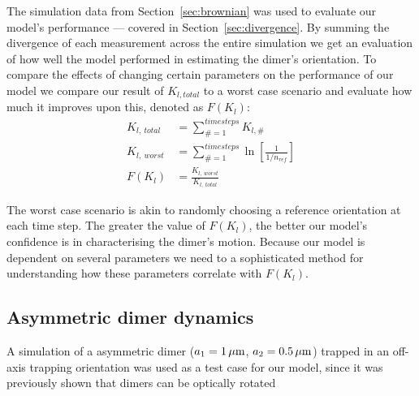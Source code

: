 The simulation data from Section~\ref{sec:brownian} was used to evaluate our model's performance --- covered in Section~\ref{sec:divergence}. By summing the divergence of each measurement across the entire simulation we get an evaluation of how well the model performed in estimating the dimer's orientation. To compare the effects of changing certain parameters on the performance of our model we compare our result of $K_{l,total}$ to a worst case scenario and evaluate how much it improves upon this, denoted as $F(K_l)$:
\begin{align}
	K_{l, \ total} &= \sum\limits_{\# =1}^{timesteps} K_{l,\#}
	\\
	K_{l, \ worst} &= \sum\limits_{\#=1}^{timesteps} \ln \left[\frac{1}{1/n_{ref}} \right]
	\\
	F(K_l) &= \frac{K_{l,\ worst}}{K_{l, \ total}}
\end{align}

The worst case scenario is akin to randomly choosing a reference
orientation at each time step. The greater the value of $F(K_l)$, the
better our model's confidence is in characterising the dimer's
motion. Because our model is dependent on several parameters we need
to a sophisticated method for understanding how these parameters
correlate with $F(K_l)$.

\subsection{Asymmetric dimer dynamics}
\label{sec:motion}
A simulation of a asymmetric dimer ($a_1=1\,\mu{\rm m}$, $a_2=0.5\,\mu{\rm m}$) 
trapped in an off-axis trapping orientation was used as a test case for our 
model, since it was previously shown that dimers can be optically rotated 

